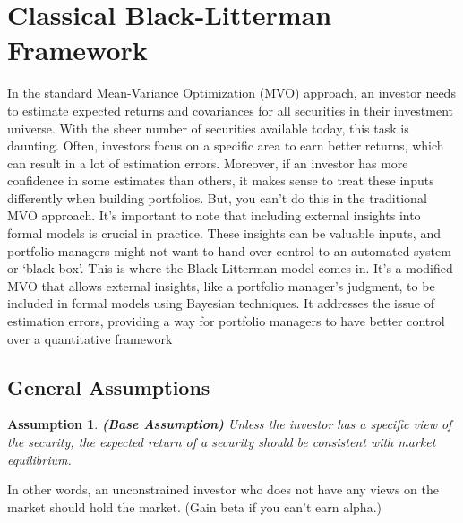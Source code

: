 \documentclass[13pt]{article}
\newtheorem{assumption}[theorem]{Assumption}
\theoremstyle{definition}
\theoremstyle{remark}
\newenvironment{remark}
  {\pushQED{\qed}\renewcommand{\qedsymbol}{$\triangle$}\remarkx}
  {\popQED\endremarkx}
\begin{document}
\newpage
\section{Classical Black-Litterman Framework}
In the standard Mean-Variance Optimization (MVO) approach, an investor needs to estimate expected returns and covariances for all securities in their investment universe. With the sheer number of securities available today, this task is daunting. Often, investors focus on a specific area to earn better returns, which can result in a lot of estimation errors. Moreover, if an investor has more confidence in some estimates than others, it makes sense to treat these inputs differently when building portfolios. But, you can't do this in the traditional MVO approach. It's important to note that including external insights into formal models is crucial in practice. These insights can be valuable inputs, and portfolio managers might not want to hand over control to an automated system or `black box'. This is where the Black-Litterman model comes in. It's a modified MVO that allows external insights, like a portfolio manager's judgment, to be included in formal models using Bayesian techniques. It addresses the issue of estimation errors, providing a way for portfolio managers to have better control over a quantitative framework



\subsection{General Assumptions}

\begin{assumption} \textbf{(Base Assumption)}
    Unless the investor has a specific view of the security, the expected return of a security should be consistent with market equilibrium.
\end{assumption}
\begin{remark}
    In other words, an unconstrained investor who does not have any
views on the market should hold the market. (Gain beta if you can't earn alpha.)
\end{remark}
\end{document}

